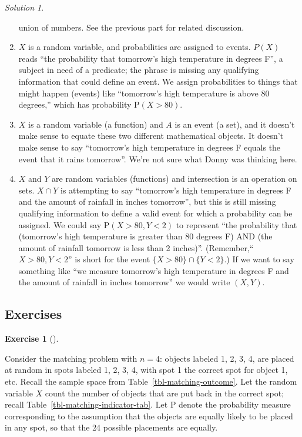\documentclass[
  letterpaper,
  DIV=11,
  numbers=noendperiod]{scrreprt}
\theoremstyle{plain}
\theoremstyle{definition}
\theoremstyle{definition}
\newtheorem{exercise}{Exercise}[chapter]
\theoremstyle{definition}
\theoremstyle{remark}
\newtheorem{refsolution}{Solution}[chapter]
\begin{document}
\begin{tcolorbox}
\begin{refsolution}
\begin{enumerate}
  union of numbers. See the previous part for related discussion.
\item
  \(X\) is a random variable, and probabilities are assigned to events.
  \(P(X)\) reads ``the probability that tomorrow's high temperature in
  degrees F'', a subject in need of a predicate; the phrase is missing
  any qualifying information that could define an event. We assign
  probabilities to things that might happen (events) like ``tomorrow's
  high temperature is above 80 degrees,'' which has probability
  \(\textrm{P}(X > 80)\).
\item
  \(X\) is a random variable (a function) and \(A\) is an event (a set),
  and it doesn't make sense to equate these two different mathematical
  objects. It doesn't make sense to say ``tomorrow's high temperature in
  degrees F equals the event that it rains tomorrow''. We're not sure
  what Donny was thinking here.
\item
  \(X\) and \(Y\) are random variables (functions) and intersection is
  an operation on sets. \(X \cap Y\) is attempting to say ``tomorrow's
  high temperature in degrees F and the amount of rainfall in inches
  tomorrow'', but this is still missing qualifying information to define
  a valid event for which a probability can be assigned. We could say
  \(\textrm{P}(X > 80, Y < 2)\) to represent ``the probability that
  (tomorrow's high temperature is greater than 80 degrees F) AND (the
  amount of rainfall tomorrow is less than 2 inches)''.
  (Remember,``\(X > 80, Y < 2\)'' is short for the event
  \(\{X > 80\} \cap \{Y < 2\}\).) If we want to say something like ``we
  measure tomorrow's high temperature in degrees F and the amount of
  rainfall in inches tomorrow'' we would write \((X, Y)\).
\end{enumerate}

\label{sol-dd-notation}

\end{refsolution}

\end{tcolorbox}

\subsection{Exercises}\label{exercises-12}

\begin{exercise}[]\protect\hypertarget{exr-probspace-matching}{}\label{exr-probspace-matching}

Consider the matching problem with \(n=4\): objects labeled 1, 2, 3, 4,
are placed at random in spots labeled 1, 2, 3, 4, with spot 1 the
correct spot for object 1, etc. Recall the sample space from
Table~\ref{tbl-matching-outcome}. Let the random variable \(X\) count
the number of objects that are put back in the correct spot; recall
Table~\ref{tbl-matching-indicator-tab}. Let \(\textrm{P}\) denote the
probability measure corresponding to the assumption that the objects are
equally likely to be placed in any spot, so that the 24 possible
placements are equally.

\end{exercise}
\end{document}
